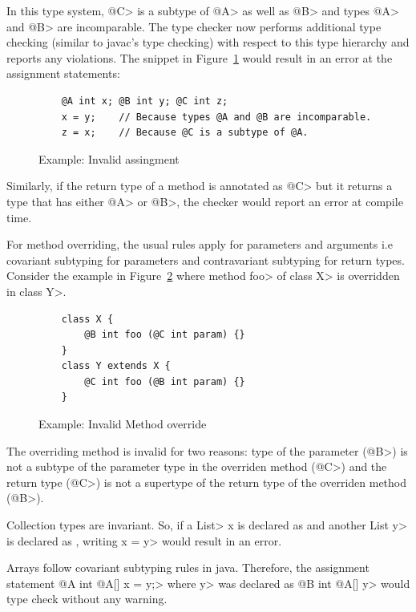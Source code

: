 In this type system, \<@C> is a subtype of \<@A> as well as \<@B> and types \<@A> and \<@B> are incomparable.
The type checker now performs additional type checking (similar to javac's type checking) with respect to this type hierarchy
and reports any violations. The snippet in Figure~\ref{code-invalid1} would result in an error at the assignment statements:
\begin{figure}
	\begin{verbatim}
	@A int x; @B int y; @C int z;
	x = y;    // Because types @A and @B are incomparable.
	z = x;    // Because @C is a subtype of @A.
	\end{verbatim}
\caption{Example: Invalid assingment}
\label{code-invalid1}
\end{figure}

Similarly, if the return type of a method is annotated as \<@C> but it returns a type that has either \<@A> or \<@B>, the
checker would report an error at compile time.

For method overriding, the usual rules apply for parameters and arguments i.e covariant subtyping for parameters
and contravariant subtyping for return types. Consider the example in Figure~\ref{code-invalid2} where method \<foo> of \<class X> is overridden
in \<class Y>.
\begin{figure}
	\begin{verbatim}
	class X {
	    @B int foo (@C int param) {}
	}
	class Y extends X {
	    @C int foo (@B int param) {}
	}
	\end{verbatim}
	\caption{Example: Invalid Method override}
	\label{code-invalid2}
\end{figure}

The overriding method is invalid for two reasons: type of the parameter (\<@B>) is not a subtype of the parameter type in the overriden method (\<@C>) and the return type (\<@C>) is not a supertype of the return type of the overriden method (\<@B>).

Collection types are invariant. So, if a \<List> x is declared as  and another \<List y> is declared
as  , writing \<x = y> would result in an error.

Arrays follow covariant subtyping rules in java. Therefore, the assignment statement \<@A int @A[] x = y;> where \<y> was 
declared as \<@B int @A[] y> would type check without any warning.


